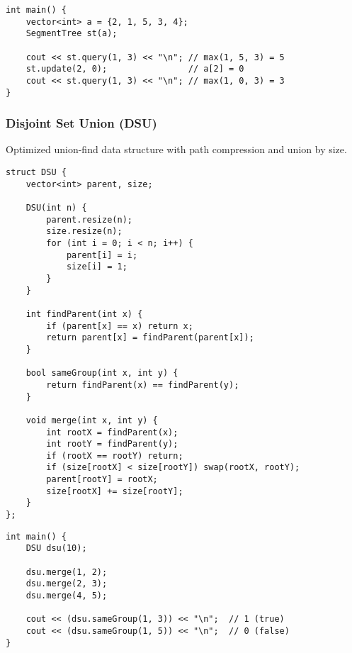 \documentclass[11pt,a4paper]{article}
\begin{document}
\begin{lstlisting}[caption={Segment Tree Max Example Usage}]
int main() {
    vector<int> a = {2, 1, 5, 3, 4};
    SegmentTree st(a);

    cout << st.query(1, 3) << "\n"; // max(1, 5, 3) = 5
    st.update(2, 0);                // a[2] = 0
    cout << st.query(1, 3) << "\n"; // max(1, 0, 3) = 3
}
\end{lstlisting}

\newpage

\subsubsection{Disjoint Set Union (DSU)}
Optimized union-find data structure with path compression and union by size.

\begin{lstlisting}[caption={DSU with Vector}]
struct DSU {
    vector<int> parent, size;

    DSU(int n) {
        parent.resize(n);
        size.resize(n);
        for (int i = 0; i < n; i++) {
            parent[i] = i;
            size[i] = 1;
        }
    }

    int findParent(int x) {
        if (parent[x] == x) return x;
        return parent[x] = findParent(parent[x]);
    }

    bool sameGroup(int x, int y) {
        return findParent(x) == findParent(y);
    }

    void merge(int x, int y) {
        int rootX = findParent(x);
        int rootY = findParent(y);
        if (rootX == rootY) return;
        if (size[rootX] < size[rootY]) swap(rootX, rootY);
        parent[rootY] = rootX;
        size[rootX] += size[rootY];
    }
};
\end{lstlisting}

\begin{lstlisting}[caption={DSU Example Usage}]
int main() {
    DSU dsu(10);

    dsu.merge(1, 2);
    dsu.merge(2, 3);
    dsu.merge(4, 5);

    cout << (dsu.sameGroup(1, 3)) << "\n";  // 1 (true)
    cout << (dsu.sameGroup(1, 5)) << "\n";  // 0 (false)
}
\end{lstlisting}
\end{document}
